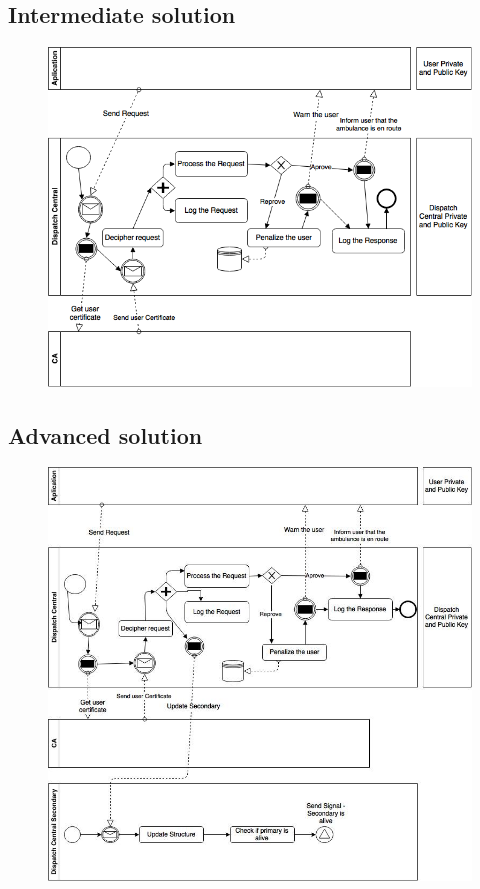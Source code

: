 \documentclass[a4paper,titlepage,11pt]{article}
\begin{document}
\subsection{Intermediate solution}
\begin{figure}[h]
    \centering
    \includegraphics[scale=0.45]{img/intermediate-solution.png}
\end{figure}

\newpage

\subsection{Advanced solution}
\begin{figure}[h]
    \centering
    \includegraphics[scale=0.50]{img/advanced-solution.png}
\end{figure}
\end{document}
